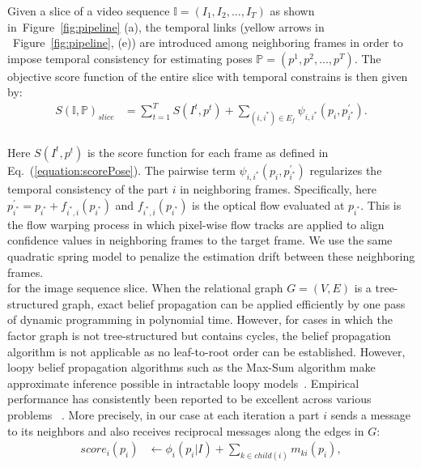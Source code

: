 \documentclass[10pt,twocolumn,letterpaper]{article}
\newcommand{\figref}[1]{Figure~\ref{#1}}
\newcommand{\refequ}[1]{Eq.~(\ref{#1})}
\begin{document}
Given a slice of a video sequence $\mathbb{I} = (I_1,I_2,...,I_T)$ as shown in~\figref{fig:pipeline} (a), the temporal links (yellow arrows in ~\figref{fig:pipeline}, (e)) are introduced among neighboring frames in order to impose temporal consistency for estimating poses $\mathbb{P} = (p^1,p^2,...,p^T)$. The objective score function of the entire slice with temporal constrains is then given by:
\begin{equation}
\begin{aligned}
S(\mathbb{I,P})_{slice} &= \sum_{t=1}^{T}S(I^t,p^t)+\sum_{(i,i^{\ast}) \in E_f}\psi_{i,i^{\ast}}(p_{i}, p^{\prime}_{i^{\ast}}).\\
\end{aligned}
\label{equation:scoreSlice}
\end{equation}

Here $S(I^t,p^t)$ is the score function for each frame as defined in \refequ{equation:scorePose}. The pairwise term $\psi_{i,i^{\ast}}(p_{i}, p^{\prime}_{i^{\ast}})$ regularizes the temporal consistency of the part $i$ in neighboring frames. Specifically, here $p^{\prime}_{i^{\ast}} =  p_{i^{\ast}}+f_{i^{\ast},i}(p_{i^{\ast}})$ and $f_{i^{\ast},i}(p_{i^{\ast}})$ is the optical flow evaluated at $p_{i^{\ast}}$. This is the flow warping process in which pixel-wise flow tracks  are applied to align confidence values in neighboring frames to the target frame. We use the same quadratic spring model to penalize the estimation drift between these neighboring frames.\\
for the image sequence slice.  When the relational graph $G = (V,E)$ is a tree-structured graph, exact belief propagation can be applied efficiently by one pass of dynamic programming in polynomial time. However, for cases in which the factor graph is not tree-structured but contains cycles, the belief propagation algorithm is not applicable as no leaf-to-root order can be established.
However, loopy belief propagation algorithms such as the Max-Sum algorithm make approximate inference
possible in intractable loopy models~\cite{NIPS1997_1467}. Empirical performance has consistently been reported to be excellent across various problems ~\cite{yang2016end,sigal2006measure}.
More precisely, in our case at each iteration a part $i$ sends a message to its neighbors and also receives reciprocal messages along the edges in $G$:
\begin{equation}
\begin{aligned}
score_i(p_i) &\leftarrow \phi_i(p_i|I)+\sum_{k\in child(i)}m_{ki}(p_i),
\end{aligned}
\label{equation:MP}
\end{equation}
\end{document}
